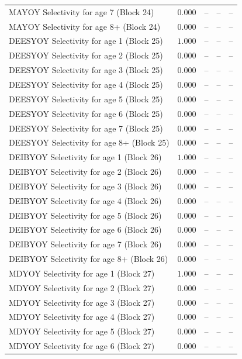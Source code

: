 \documentclass[
]{article}
\begin{document}
\begin{landscape}
\begin{longtable}[t]{lrrrr}
MAYOY Selectivity for age 7 (Block 24) & $0.000$ & -- & -- & --\\
MAYOY Selectivity for age 8+ (Block 24) & $0.000$ & -- & -- & --\\
DEESYOY Selectivity for age 1 (Block 25) & $1.000$ & -- & -- & --\\
DEESYOY Selectivity for age 2 (Block 25) & $0.000$ & -- & -- & --\\
\addlinespace
DEESYOY Selectivity for age 3 (Block 25) & $0.000$ & -- & -- & --\\
DEESYOY Selectivity for age 4 (Block 25) & $0.000$ & -- & -- & --\\
DEESYOY Selectivity for age 5 (Block 25) & $0.000$ & -- & -- & --\\
DEESYOY Selectivity for age 6 (Block 25) & $0.000$ & -- & -- & --\\
DEESYOY Selectivity for age 7 (Block 25) & $0.000$ & -- & -- & --\\
\addlinespace
DEESYOY Selectivity for age 8+ (Block 25) & $0.000$ & -- & -- & --\\
DEIBYOY Selectivity for age 1 (Block 26) & $1.000$ & -- & -- & --\\
DEIBYOY Selectivity for age 2 (Block 26) & $0.000$ & -- & -- & --\\
DEIBYOY Selectivity for age 3 (Block 26) & $0.000$ & -- & -- & --\\
DEIBYOY Selectivity for age 4 (Block 26) & $0.000$ & -- & -- & --\\
\addlinespace
DEIBYOY Selectivity for age 5 (Block 26) & $0.000$ & -- & -- & --\\
DEIBYOY Selectivity for age 6 (Block 26) & $0.000$ & -- & -- & --\\
DEIBYOY Selectivity for age 7 (Block 26) & $0.000$ & -- & -- & --\\
DEIBYOY Selectivity for age 8+ (Block 26) & $0.000$ & -- & -- & --\\
MDYOY Selectivity for age 1 (Block 27) & $1.000$ & -- & -- & --\\
\addlinespace
MDYOY Selectivity for age 2 (Block 27) & $0.000$ & -- & -- & --\\
MDYOY Selectivity for age 3 (Block 27) & $0.000$ & -- & -- & --\\
MDYOY Selectivity for age 4 (Block 27) & $0.000$ & -- & -- & --\\
MDYOY Selectivity for age 5 (Block 27) & $0.000$ & -- & -- & --\\
MDYOY Selectivity for age 6 (Block 27) & $0.000$ & -- & -- & --\\

\end{longtable}
\end{landscape}
\end{document}

